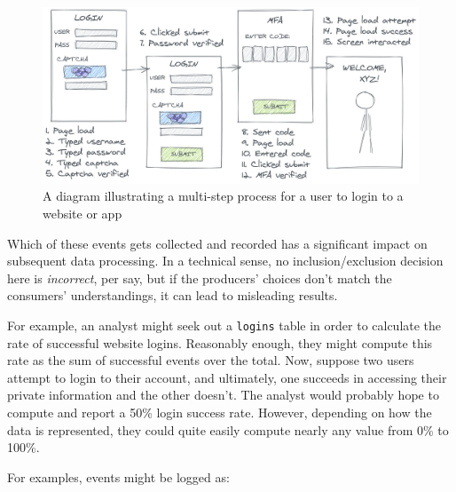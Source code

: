 \documentclass[
]{krantz}
\begin{document}
\begin{figure}

{\centering \includegraphics[width=0.9\linewidth]{figures/data-dall/login-log} 

}

\caption{A diagram illustrating a multi-step process for a user to login to a website or app}\label{fig:login-log}
\end{figure}

Which of these events gets collected and recorded has a significant impact on subsequent data processing.
In a technical sense, no inclusion/exclusion decision here is \emph{incorrect}, per say, but if the producers' choices don't match the consumers' understandings, it can lead to misleading results.

For example, an analyst might seek out a \texttt{logins} table in order to calculate the rate of successful website logins.
Reasonably enough, they might compute this rate as the sum of successful events over the total.
Now, suppose two users attempt to login to their account, and ultimately, one succeeds in accessing their private information and the other doesn't.
The analyst would probably hope to compute and report a 50\% login success rate. However, depending on how the data is represented, they could quite easily compute nearly any value from 0\% to 100\%.

For examples, events might be logged as:
\end{document}

